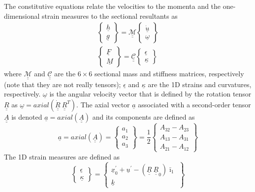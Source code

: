 \documentclass{aiaa-tc}
\newcommand{\tens}[1]{\underline{\underline{#1}}}
\renewcommand{\vec}[1]{\underline{#1}}
\begin{document}
The constitutive equations relate the velocities to the momenta and the one-dimensional strain measures to the sectional resultants as
\begin{align}
	\label{ConstitutiveMass}
	\begin{Bmatrix}
	\underline{h} \\
	\underline{g}
	\end{Bmatrix}
	= \underline{\underline{\mathcal{M}}} \begin{Bmatrix}
	\dot{\underline{u}} \\
	\underline{\omega}
	\end{Bmatrix} \\
	\label{ConstitutiveStiff}
	\begin{Bmatrix}
	\underline{F} \\
	\underline{M}
	\end{Bmatrix}
	= \underline{\underline{\mathcal{C}}} \begin{Bmatrix}
	\underline{\epsilon} \\
	\underline{\kappa}
	\end{Bmatrix}
\end{align}
where $\underline{\underline{\mathcal{M}}}$ and
$\underline{\underline{\mathcal{C}}}$ are the $6 \times 6$ sectional mass
and stiffness matrices, respectively (note that they are not really tensors);
$\underline{\epsilon}$ and $\underline{\kappa}$ are the 1D strains and
curvatures, respectively. $\underline{\omega}$ is the angular velocity
vector that is defined by the rotation tensor $\underline{\underline{R}}$ as
$\underline{\omega} =
axial(\dot{\underline{\underline{R}}}~\underline{\underline{R}}^T)$. The axial vector $\vec{a}$ associated with a second-order tensor $\tens{A}$ is denoted $\vec{a}=axial(\tens{A})$ and its components are defined as
\begin{equation}
    \label{axial}
    \vec{a} = axial(\tens{A})=\begin{Bmatrix}
    a_1 \\
    a_2 \\
    a_3
    \end{Bmatrix}
    =\frac{1}{2}
    \begin{Bmatrix}
    A_{32}-A_{23} \\
    A_{13}-A_{31} \\
    A_{21}-A_{12}
    \end{Bmatrix}
\end{equation}
The 1D strain measures are defined as
\begin{equation}
    \label{1DStrain}
    \begin{Bmatrix}
        \vec{\epsilon} \\
        \vec{\kappa}
    \end{Bmatrix}
    =
    \begin{Bmatrix}
        \vec{x}^\prime_0 + \vec{u}^\prime - (\tens{R} ~\tens{R}_0) \bar{\imath}_1 \\
        \vec{k}
    \end{Bmatrix}
\end{equation}
\end{document}
